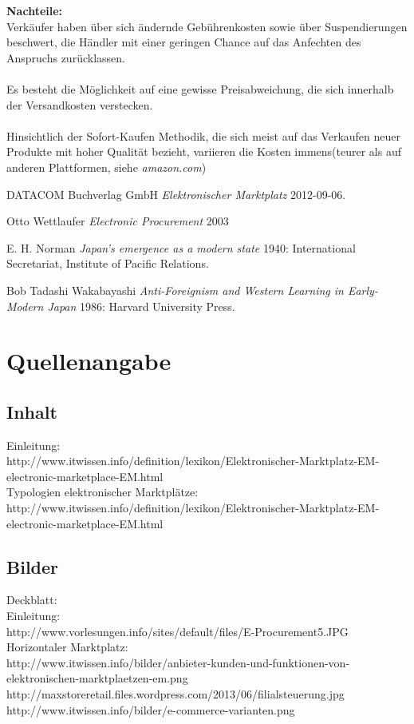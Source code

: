 \documentclass[11pt,a4paper]{article}
\begin{document}
\noindent \textbf{Nachteile:} \\
Verkäufer haben über sich ändernde Gebührenkosten sowie über Suspendierungen beschwert, die Händler mit einer geringen Chance auf das Anfechten des Anspruchs zurücklassen.\\ \\
Es besteht die Möglichkeit auf eine gewisse Preisabweichung, die sich innerhalb der Versandkosten verstecken. \\ \\
Hinsichtlich der Sofort-Kaufen Methodik, die sich meist auf das Verkaufen neuer Produkte mit hoher Qualität bezieht, variieren die Kosten immens(teurer als auf anderen Plattformen, siehe \textit{amazon.com})
\newpage
\begin{thebibliography}{1}
	
	 DATACOM Buchverlag GmbH {\em Elektronischer Marktplatz}  2012-09-06.
	
	  Otto Wettlaufer {\em Electronic Procurement} 2003
	
	 E. H. Norman {\em Japan's emergence as a modern
		state} 1940: International Secretariat, Institute of Pacific
	Relations.
	
	 Bob Tadashi Wakabayashi {\em Anti-Foreignism and Western
		Learning in Early-Modern Japan} 1986: Harvard University Press.
	
\end{thebibliography}
\section{Quellenangabe}
\subsection{Inhalt}
Einleitung: \\
http://www.itwissen.info/definition/lexikon/Elektronischer-Marktplatz-EM-electronic-marketplace-EM.html \\
Typologien elektronischer Marktplätze: \\
http://www.itwissen.info/definition/lexikon/Elektronischer-Marktplatz-EM-electronic-marketplace-EM.html \\
\subsection{Bilder}
Deckblatt: \\
Einleitung: \\ http://www.vorlesungen.info/sites/default/files/E-Procurement5.JPG \\
Horizontaler Marktplatz: \\
http://www.itwissen.info/bilder/anbieter-kunden-und-funktionen-von-elektronischen-marktplaetzen-em.png
\\ 
http://maxstoreretail.files.wordpress.com/2013/06/filialsteuerung.jpg \\
http://www.itwissen.info/bilder/e-commerce-varianten.png \\
\end{document}
